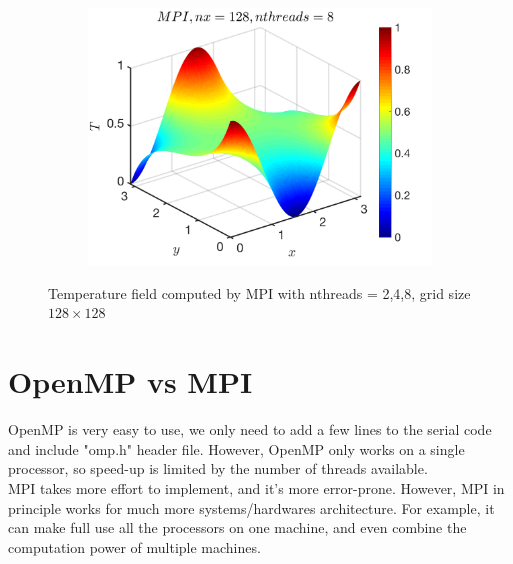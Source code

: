 \documentclass[a4paper]{article}
\begin{document}
\begin{figure}[H]
\begin{subfigure}[b]{0.32\textwidth}
        \end{subfigure}
        \
                \begin{subfigure}[b]{0.32\textwidth}   
            \centering 
            \includegraphics[width=\textwidth]{./Figure/heat_mpi_nx128_nth8.png} 
        \end{subfigure}
        \caption{Temperature field computed by MPI with nthreads = 2,4,8, grid size $128\times128$}
    \end{figure}
    
    \section{OpenMP vs MPI}
OpenMP is very easy to use, we only need to add a few lines to the serial code and include "omp.h" header file. However, OpenMP only works on a single processor, so speed-up is limited by the number of threads available.\\

MPI takes more effort to implement, and it's more error-prone. However, MPI in principle works for much more systems/hardwares architecture. For example, it can make full use all the processors on one machine, and even combine the computation power of multiple machines.
    
\end{document}
